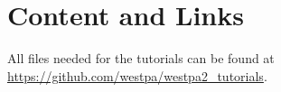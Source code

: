 \section{Content and Links}
All files needed for the tutorials can be found at \url{https://github.com/westpa/westpa2_tutorials}. 